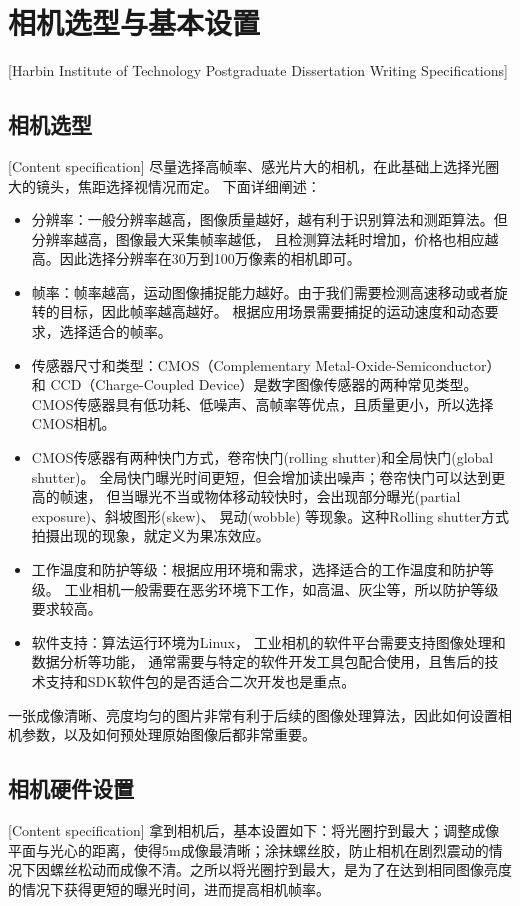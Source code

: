 

\chapter[相机选型与基本设置]{相机选型与基本设置}[Harbin Institute of Technology Postgraduate Dissertation Writing Specifications]

\section{相机选型}[Content specification]
尽量选择高帧率、感光片大的相机，在此基础上选择光圈大的镜头，焦距选择视情况而定。
下面详细阐述：\par

\begin{itemize}[itemindent=2em]
    \item 分辨率：一般分辨率越高，图像质量越好，越有利于识别算法和测距算法。但分辨率越高，图像最大采集帧率越低，
    且检测算法耗时增加，价格也相应越高。因此选择分辨率在30万到100万像素的相机即可。
    \item 帧率：帧率越高，运动图像捕捉能力越好。由于我们需要检测高速移动或者旋转的目标，因此帧率越高越好。
    根据应用场景需要捕捉的运动速度和动态要求，选择适合的帧率。
    \item 传感器尺寸和类型：CMOS（Complementary Metal-Oxide-Semiconductor）和 CCD（Charge-Coupled Device）是数字图像传感器的两种常见类型。
    CMOS传感器具有低功耗、低噪声、高帧率等优点，且质量更小，所以选择CMOS相机。
    \item CMOS传感器有两种快门方式，卷帘快门(rolling shutter)和全局快门(global shutter)。
    全局快门曝光时间更短，但会增加读出噪声；卷帘快门可以达到更高的帧速，
    但当曝光不当或物体移动较快时，会出现部分曝光(partial exposure)、斜坡图形(skew)、
    晃动(wobble) 等现象。这种Rolling shutter方式拍摄出现的现象，就定义为果冻效应。
    \item 工作温度和防护等级：根据应用环境和需求，选择适合的工作温度和防护等级。
    工业相机一般需要在恶劣环境下工作，如高温、灰尘等，所以防护等级要求较高。
    \item 软件支持：算法运行环境为Linux，
    工业相机的软件平台需要支持图像处理和数据分析等功能，
    通常需要与特定的软件开发工具包配合使用，且售后的技术支持和SDK软件包的是否适合二次开发也是重点。

\end{itemize}


一张成像清晰、亮度均匀的图片非常有利于后续的图像处理算法，因此如何设置相机参数，以及如何预处理原始图像后都非常重要。
\section{相机硬件设置}[Content specification]
拿到相机后，基本设置如下：将光圈拧到最大；调整成像平面与光心的距离，使得5m成像最清晰；涂抹螺丝胶，防止相机在剧烈震动的情况下因螺丝松动而成像不清。之所以将光圈拧到最大，是为了在达到相同图像亮度的情况下获得更短的曝光时间，进而提高相机帧率。
